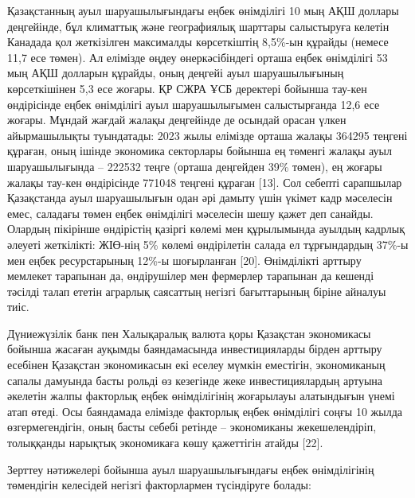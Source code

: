{{Қазақстанның ауыл шаруашылығындағы еңбек өнімділігі 10 мың АҚШ доллары
деңгейінде, бұл климаттық және географиялық шарттары салыстыруға келетін
Канадада қол жеткізілген максималды көрсеткіштің 8,5\%-ын құрайды
(немесе 11,7 есе төмен). Ал елімізде өңдеу өнеркәсібіндегі орташа еңбек
өнімділігі 53 мың АҚШ долларын құрайды, оның деңгейі ауыл шаруашылығының
көрсеткішінен 5,3 есе жоғары. ҚР СЖРА ҰСБ деректері бойынша тау-кен
өндірісінде еңбек өнімділігі ауыл шаруашылығымен салыстырғанда 12,6 есе
жоғары. Мұндай жағдай жалақы деңгейінде де осындай орасан үлкен
айырмашылықты туындатады: 2023 жылы елімізде орташа жалақы 364295
теңгені құраған, оның ішінде экономика секторлары бойынша ең төменгі
жалақы ауыл шаруашылығында -- 222532 теңге (орташа деңгейден 39\%
төмен), ең жоғары жалақы тау-кен өндірісінде 771048 теңгені құраған
{[}13{]}. Сол себепті сарапшылар Қазақстанда ауыл шаруашылығын одан әрі
дамыту үшін үкімет кадр мәселесін емес, саладағы төмен еңбек өнімділігі
мәселесін шешу қажет деп санайды. Олардың пікірінше өндірістің қазіргі
көлемі мен құрылымында ауылдың кадрлық әлеуеті жеткілікті: ЖІӨ-нің 5\%
көлемі өндірілетін салада ел тұрғындардың 37\%-ы мен еңбек ресурстарының
12\%-ы шоғырланған {[}20{]}. Өнімділікті арттыру мемлекет тарапынан да,
өндірушілер мен фермерлер тарапынан да кешенді тәсілді талап ететін
аграрлық саясаттың негізгі бағыттарының біріне айналуы тиіс.

Дүниежүзілік банк пен Халықаралық валюта қоры Қазақстан экономикасы
бойынша жасаған ауқымды баяндамасында инвестицияларды бірден арттыру
есебінен Қазақстан экономикасын екі еселеу мүмкін еместігін,
экономиканың сапалы дамуында басты рольді өз кезегінде жеке
инвестициялардың артуына әкелетін жалпы факторлық еңбек өнімділігінің
жоғарылауы алатындығын үнемі атап өтеді. Осы баяндамада елімізде
факторлық еңбек өнімділігі соңғы 10 жылда өзгермегендігін, оның басты
себебі ретінде -- экономиканы жекешелендіріп, толыққанды нарықтық
экономикаға көшу қажеттігін атайды {[}22{]}.

Зерттеу нәтижелері бойынша ауыл шаруашылығындағы еңбек өнімділігінің
төмендігін келесідей негізгі факторлармен түсіндіруге болады:

}}
